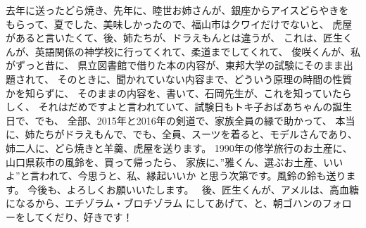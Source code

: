 \documentclass{jsarticle}
\begin{document}
\title{}
\author{}
\date{}
\maketitle

   去年に送ったどら焼き、先年に、睦世お姉さんが、銀座からアイスどらやきを
   もらって、夏でした、美味しかったので、福山市はクワイだけでないと、
   虎屋があると言いたくて、後、姉たちが、ドラえもんとは違うが、
   これは、匠生くんが、英語関係の神学校に行ってくれて、柔道までしてくれて、
   俊咲くんが、私がずっと昔に、
   県立図書館で借りた本の内容が、東邦大学の試験にそのまま出題されて、
   そのときに、聞かれていない内容まで、どういう原理の時間の性質かを知らずに、
   そのままの内容を、書いて、石岡先生が、これを知っていたらしく、
   それはだめですよと言われていて、試験日もトキ子おばあちゃんの誕生日で、でも、
   全部、2015年と2016年の剣道で、家族全員の縁で助かって、
   本当に、姉たちがドラえもんで、でも、全員、スーツを着ると、モデルさんであり、
   姉二人に、どら焼きと羊羹、虎屋を送ります。
   1990年の修学旅行のお土産に、山口県萩市の風鈴を、買って帰ったら、
   家族に、”雅くん、選ぶお土産、いいよ”と言われて、今思うと、私、縁起いいか
   と思う次第です。風鈴の鈴も送ります。
   今後も、よろしくお願いいたします。　
   後、匠生くんが、アメルは、高血糖になるから、エチゾラム・ブロチゾラム
   にしてあげて、と、朝ゴハンのフォローをしてくだり、好きです！
\end{document}

